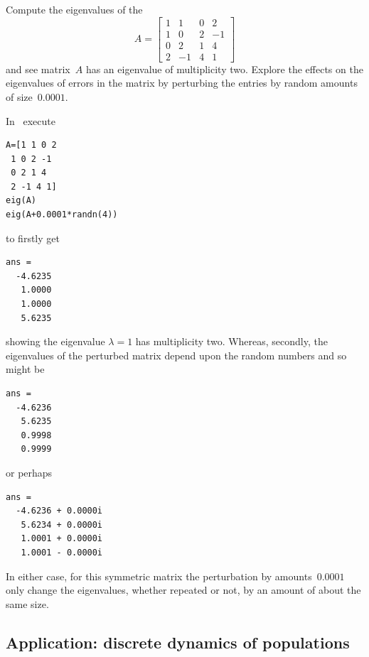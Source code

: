 \begin{example} \label{eg:}
Compute the eigenvalues of the 
\begin{equation*}
A=\begin{bmatrix}1&1&0&2
\\1&0&2&-1
\\0&2&1&4
\\2&-1&4&1\end{bmatrix}
\end{equation*}
and see matrix~\(A\) has an eigenvalue of multiplicity two.  
Explore the effects on the eigenvalues of errors in the matrix by perturbing the entries by random amounts of size~\(0.0001\).
\begin{solution} 
In \script\ execute
\begin{verbatim}
A=[1 1 0 2
 1 0 2 -1
 0 2 1 4
 2 -1 4 1]
eig(A)
eig(A+0.0001*randn(4))
\end{verbatim}
\setbox\ajrqrbox\hbox{}%
\marginpar{\usebox{\ajrqrbox}}%
to firstly get
\begin{verbatim}
ans =
  -4.6235
   1.0000
   1.0000
   5.6235
\end{verbatim}
showing the eigenvalue \(\lambda=1\) has multiplicity two.
Whereas, secondly, the eigenvalues of the perturbed matrix depend upon the random numbers and so might be
\begin{verbatim}
ans =
  -4.6236
   5.6235
   0.9998
   0.9999
\end{verbatim}
or perhaps
\begin{verbatim}
ans =
  -4.6236 + 0.0000i
   5.6234 + 0.0000i
   1.0001 + 0.0000i
   1.0001 - 0.0000i
\end{verbatim}
In either case, for this symmetric matrix the perturbation by amounts~\(0.0001\) only change the eigenvalues, whether repeated or not, by an amount of about the same size.
\end{solution}
\end{example}











\subsection{Application: discrete dynamics of populations}
\label{sec:ddp}

